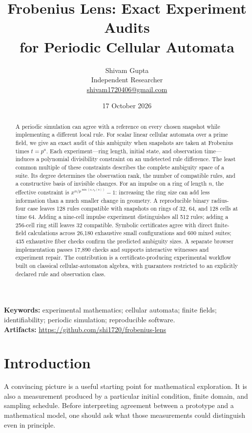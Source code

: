 \documentclass[11pt]{article}
\title{\textbf{Frobenius Lens: Exact Experiment Audits\\for Periodic Cellular Automata}}
\author{Shivam Gupta\\Independent Researcher\\\href{mailto:shivam1720406@gmail.com}{shivam1720406@gmail.com}}
\date{17 October 2026}
\begin{document}
\maketitle
\begin{abstract}
A periodic simulation can agree with a reference on every chosen snapshot while implementing a different local rule. For scalar linear cellular automata over a prime field, we give an exact audit of this ambiguity when snapshots are taken at Frobenius times $t=p^a$. Each experiment---ring length, initial state, and observation time---induces a polynomial divisibility constraint on an undetected rule difference. The least common multiple of these constraints describes the complete ambiguity space of a suite. Its degree determines the observation rank, the number of compatible rules, and a constructive basis of invisible changes. For an impulse on a ring of length $n$, the effective constraint is $x^{n/p^{\min(a,v_p(n))}}-1$: increasing the ring size can add less information than a much smaller change in geometry. A reproducible binary radius-four case leaves 128 rules compatible with snapshots on rings of 32, 64, and 128 cells at time 64. Adding a nine-cell impulse experiment distinguishes all 512 rules; adding a 256-cell ring still leaves 32 compatible. Symbolic certificates agree with direct finite-field calculations across 26,180 exhaustive small configurations and 600 mixed suites; 435 exhaustive fiber checks confirm the predicted ambiguity sizes. A separate browser implementation passes 17,890 checks and supports interactive witnesses and experiment repair. The contribution is a certificate-producing experimental workflow built on classical cellular-automaton algebra, with guarantees restricted to an explicitly declared rule and observation class.
\end{abstract}
\vspace{3pt}
\noindent\textbf{Keywords:} experimental mathematics; cellular automata; finite fields; identifiability; periodic simulation; reproducible software.\\
\textbf{Artifacts:} \url{https://github.com/shi1720/frobenius-lens}

\section{Introduction}
A convincing picture is a useful starting point for mathematical exploration. It is also a measurement produced by a particular initial condition, finite domain, and sampling schedule. Before interpreting agreement between a prototype and a mathematical model, one should ask what those measurements could distinguish even in principle.
\end{document}
